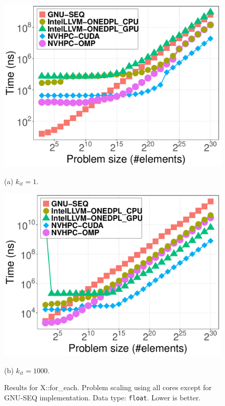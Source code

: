\documentclass[sigconf]{acmart}
\begin{document}
\begin{figure}[H]
      \centering
      \begin{minipage}[t]{0.48\linewidth}
            \centering
            \includegraphics[width=\linewidth]{figures/gpu_problemSize_time-for_each-k1}
            \caption*{(a) $k_{it} = 1$.}
      \end{minipage}
      \hfill
      \begin{minipage}[t]{0.48\linewidth}
            \centering
            \includegraphics[width=\linewidth]{figures/gpu_problemSize_time-for_each-k1000}
            \caption*{(b) $k_{it} = 1000$.}
      \end{minipage}
      \caption{Results for X::for\_each. Problem scaling using all cores except for GNU-SEQ implementation.
            Data type: \texttt{float}. Lower is better.}
      \label{fig:gpu_problemSize_time-for_each}
\end{figure}
\end{document}
